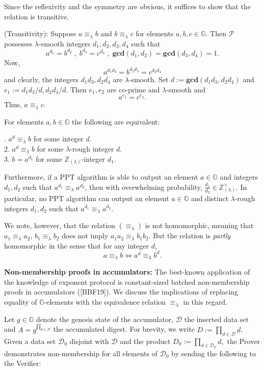 \documentclass[11pt, lettersize, notitlepage, leqno, footskip=0.6cm]{article}
\newcommand{\bz}{\mathbb Z}
\newcommand{\pl}{\prod\limits}
\newcommand{\LRA}{\Longleftrightarrow}
\newcommand{\eqlam}{\equiv_{\lam}}
\newcommand{\mc}{\mathcal}
\newcommand{\mb}{\mathbb}
\newcommand{\mbf}{\mathbf}
\newcommand{\lam}{\lambda}
\newcommand{\bzlam}{\bz_{(\lam)}}
\newcommand{\vs}{\vspace{-0.15cm}}
\newcommand{\noin}{\noindent}
\newcommand{\op}{overwhelming probability}
\newcommand{\GCD}{\mbf{gcd}}
\numberwithin{equation}{section}
\begin{document}
\begin{prf} Since the reflexivity and the symmetry are obvious, it suffices to show that the relation is transitive.

\noindent (Transitivity): Suppose $a \equiv_{\lam} b$ and $b \equiv_{\lam} c$ for elements $a, b, c\in\mb{G}$. Then $\mc{P}$ possesses $\lam$-smooth integers $d_1,d_2, d_3, d_4$ such that \vs $$a^{d_1} = b^{d_2}\;,\; b^{d_3} = c^{d_4}\;,\;\GCD(d_1,d_2) = \GCD(d_3,d_4) = 1.$$ Now, \vs $$a^{d_1d_3} = b^{d_2d_3} = c^{d_2 d_4}$$ and clearly, the integers $d_1d_3, d_2 d_4$ are $\lam$-smooth. Set $d:= \GCD(d_1d_3, d_2 d_4)$ and $e_1:= d_1d_3/d, d_2 d_4/d$. Then $e_1,e_2$ are co-prime and $\lam$-smooth and \vs $$ a^{e_1} = c^{e_2} .$$ Thus, $a \equiv_{\lam} c$.\end{prf}

For elements $a,b\in\mb{G}$ the following are equivalent:

\noin 1. $a^d\eqlam b$ for some integer $d$.\\
2. $a^d\eqlam b$ for some $\lam$-rough integer $d$.\\
3. $b = a^{d_1}$ for some $\bzlam$-integer $d_1$.

Furthermore, if a PPT algorithm is able to output an element $a\in\mb{G}$ and integers $d_1,d_2$ such that $a^{d_1}\eqlam a^{d_2}$, then with \op, $\frac{d_1}{d_2}\in\bzlam^{\times}$. In particular, no PPT algorithm can output an element $a\in \mb{G}$ and distinct $\lam$-rough integers $d_1,d_2$ such that $a^{d_1}\eqlam a^{d_2}$.

We note, however, that the relation $(\equiv_{\lam})$ is not homomorphic, meaning that $a_1 \equiv_{\lam} a_2$, $b_1 \equiv_{\lam} b_2$ does not imply $a_1a_2 \eqlam b_1b_2$. But the relation is \textit{partly} homomorphic in the sense that for any integer $d$, \vs $$ a \equiv_{\lam} b \LRA a^d \equiv_{\lam} b^d .$$ \vspace{0.1cm}


\noin \textbf{Non-membership proofs in accumulators:} The  best-known application of the knowledge of exponent protocol is constant-sized batched non-membership proofs in accumulators ([BBF19]). We discuss the implications of replacing equality of $\mb{G}$-elements with the equivalence relation $\eqlam$ in this regard. 

Let $g \in \mb{G}$ denote the genesis state of the accumulator, $\mc{D}$ the inserted data set and $A = g^{\pl_{d\in \mc{D}}}$ the accumulated digest. For brevity, we write $D:= \pl_{d\in \mc{D}} d$. Given a data set $\mc{D}_0$ disjoint with $\mc{D}$ and the product $D_0:= \pl_{d\in \mc{D}_0} d,$ the Prover demonstrates non-membership for all elements of $\mc{D}_0$ by sending the following to the Verifier:
\end{document}
